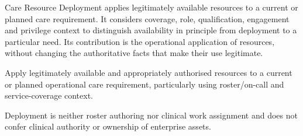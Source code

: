 Care Resource Deployment applies legitimately available resources to a current or planned care requirement. It considers coverage, role, qualification, engagement and privilege context to distinguish availability in principle from deployment to a particular need. Its contribution is the operational application of resources, without changing the authoritative facts that make their use legitimate.



Apply legitimately available and appropriately authorised resources to a current or planned operational care requirement, particularly using roster/\allowbreak{}on-call and service-coverage context.



Deployment is neither roster authoring nor clinical work assignment and does not confer clinical authority or ownership of enterprise assets.


